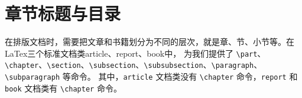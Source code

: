 \documentclass[12pt,a4paper]{ctexart}
\begin{document}

\section{章节标题与目录}
在排版文档时，需要把文章和书籍划分为不同的层次，就是章、节、小节等。在LaTex三个标准文档类article、report、book中，
为我们提供了 \verb|\part|、\verb|\chapter|、\verb|\section|、\verb|\subsection|、\verb|\subsubsection|、\verb|\paragraph|、\verb|\subparagraph| 等命令。
其中，\verb|article| 文档类没有 \verb|\chapter| 命令，\verb|report| 和 \verb|book| 文档类有 \verb|\chapter| 命令。
\end{document}
